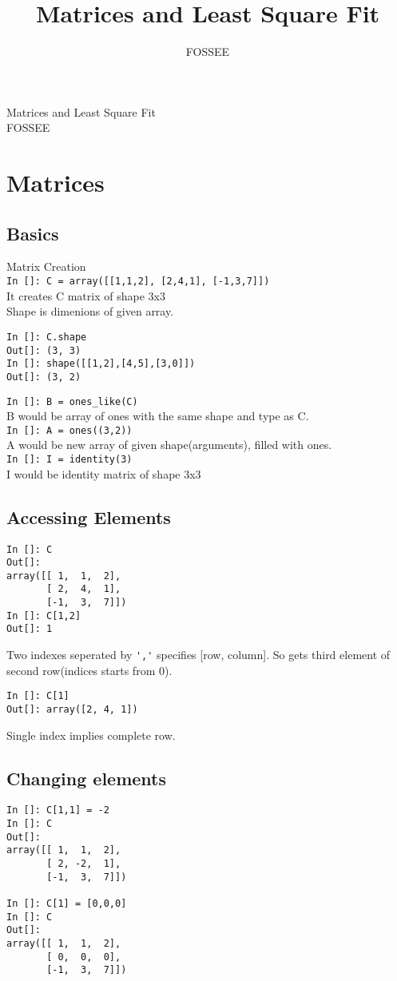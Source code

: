 \documentclass[12pt]{article}
\title{Matrices and Least Square Fit}
\author{FOSSEE}
\newcommand{\typ}[1]{\lstinline{#1}}
\begin{document}
\date{}
\vspace{-1in}
\begin{center}
\LARGE{Matrices and Least Square Fit}\\
\large{FOSSEE}
\end{center}
\section{Matrices}
\subsection{Basics}
Matrix Creation\\
\typ{In []: C = array([[1,1,2], [2,4,1], [-1,3,7]])}\\
It creates C matrix of shape 3x3\\
Shape is dimenions of given array.
\begin{lstlisting}
In []: C.shape 
Out[]: (3, 3)
In []: shape([[1,2],[4,5],[3,0]])
Out[]: (3, 2)
\end{lstlisting}
\typ{In []: B = ones_like(C)} \\
B would be array of ones with the same shape and type as C.\\
\typ{In []: A = ones((3,2))} \\
A would be new array of given shape(arguments), filled with ones.\\ 
\typ{In []: I = identity(3)}\\
I would be identity matrix of shape 3x3

\subsection{Accessing Elements}
\begin{lstlisting}
In []: C
Out[]: 
array([[ 1,  1,  2],
       [ 2,  4,  1],
       [-1,  3,  7]])
In []: C[1,2]
Out[]: 1
\end{lstlisting}
Two indexes seperated by \typ{','} specifies [row, column]. So  gets third element of second row(indices starts from 0).
\newpage
\begin{lstlisting}
In []: C[1]
Out[]: array([2, 4, 1])
\end{lstlisting}
Single index implies complete row.
\subsection{Changing elements}
\begin{lstlisting}
In []: C[1,1] = -2
In []: C
Out[]: 
array([[ 1,  1,  2],
       [ 2, -2,  1],
       [-1,  3,  7]])

In []: C[1] = [0,0,0]
In []: C
Out[]: 
array([[ 1,  1,  2],
       [ 0,  0,  0],
       [-1,  3,  7]])
\end{lstlisting}
\end{document}
